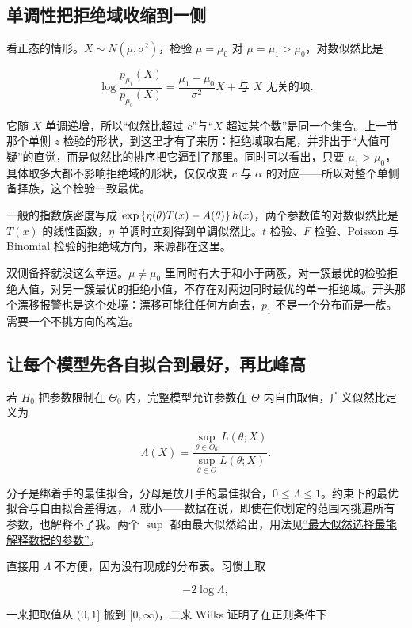 \subsection{单调性把拒绝域收缩到一侧}

看正态的情形。\(X\sim N(\mu,\sigma^2)\)，检验 \(\mu=\mu_0\) 对 \(\mu=\mu_1>\mu_0\)，对数似然比是

\[
\log\frac{p_{\mu_1}(X)}{p_{\mu_0}(X)}=\frac{\mu_1-\mu_0}{\sigma^{2}}X+\text{与 }X\text{ 无关的项} .
\]

它随 \(X\) 单调递增，所以``似然比超过 \(c\)''与``\(X\) 超过某个数''是同一个集合。上一节那个单侧 \(z\) 检验的形状，到这里才有了来历：拒绝域取右尾，并非出于``大值可疑''的直觉，而是似然比的排序把它逼到了那里。同时可以看出，只要 \(\mu_1>\mu_0\)，具体取多大都不影响拒绝域的形状，仅仅改变 \(c\) 与 \(\alpha\) 的对应——所以对整个单侧备择族，这个检验一致最优。

一般的指数族密度写成 \(\exp\left\{\eta(\theta)T(x)-A(\theta)\right\}h(x)\)，两个参数值的对数似然比是 \(T(x)\) 的线性函数，\(\eta\) 单调时立刻得到单调似然比。\(t\) 检验、\(F\) 检验、Poisson 与 Binomial 检验的拒绝域方向，来源都在这里。

双侧备择就没这么幸运。\(\mu\ne\mu_0\) 里同时有大于和小于两簇，对一簇最优的检验拒绝大值，对另一簇最优的拒绝小值，不存在对两边同时最优的单一拒绝域。开头那个漂移报警也是这个处境：漂移可能往任何方向去，\(p_1\) 不是一个分布而是一族。需要一个不挑方向的构造。

\subsection{让每个模型先各自拟合到最好，再比峰高}

若 \(H_0\) 把参数限制在 \(\Theta_0\) 内，完整模型允许参数在 \(\Theta\) 内自由取值，广义似然比定义为

\[
\Lambda(X)=\frac{\sup_{\theta\in\Theta_0}L(\theta;X)}{\sup_{\theta\in\Theta}L(\theta;X)} .
\]

分子是绑着手的最佳拟合，分母是放开手的最佳拟合，\(0\le\Lambda\le 1\)。约束下的最优拟合与自由拟合差得远，\(\Lambda\) 就小——数据在说，即使在你划定的范围内挑遍所有参数，也解释不了我。两个 \(\sup\) 都由最大似然给出，用法见\hyperref[sec:11-Mathematical-Statistics/02-Point-Estimation/03]{``最大似然选择最能解释数据的参数''}。

直接用 \(\Lambda\) 不方便，因为没有现成的分布表。习惯上取

\[
-2\log\Lambda ,
\]

一来把取值从 \((0,1]\) 搬到 \([0,\infty)\)，二来 Wilks 证明了在正则条件下

